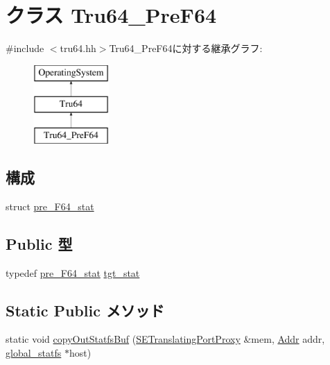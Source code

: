 \hypertarget{classTru64__PreF64}{
\section{クラス Tru64\_\-PreF64}
\label{classTru64__PreF64}
}


{\ttfamily \#include $<$tru64.hh$>$}Tru64\_\-PreF64に対する継承グラフ:\begin{figure}[H]
\begin{center}
\leavevmode
\includegraphics[height=3cm]{classTru64__PreF64}
\end{center}
\end{figure}
\subsection*{構成}
\begin{DoxyCompactItemize}
\item 
struct \hyperlink{structTru64__PreF64_1_1pre__F64__stat}{pre\_\-F64\_\-stat}
\end{DoxyCompactItemize}
\subsection*{Public 型}
\begin{DoxyCompactItemize}
\item 
typedef \hyperlink{structTru64__PreF64_1_1pre__F64__stat}{pre\_\-F64\_\-stat} \hyperlink{classTru64__PreF64_a704fbfa7adb0a1c876af25fc5367ccac}{tgt\_\-stat}
\end{DoxyCompactItemize}
\subsection*{Static Public メソッド}
\begin{DoxyCompactItemize}
\item 
static void \hyperlink{classTru64__PreF64_ab39f4973592abe61638b8b998bc5691d}{copyOutStatfsBuf} (\hyperlink{classSETranslatingPortProxy}{SETranslatingPortProxy} \&mem, \hyperlink{base_2types_8hh_af1bb03d6a4ee096394a6749f0a169232}{Addr} addr, \hyperlink{kern_2tru64_2tru64_8hh_a1a8529336c3f2704cb49ee2cd97412a8}{global\_\-statfs} $\ast$host)
\end{DoxyCompactItemize}


